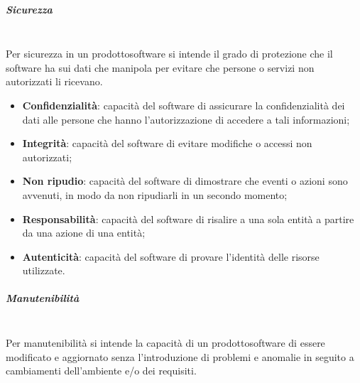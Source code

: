 		\subparagraph{Sicurezza} \mbox{}\\
		Per sicurezza in un prodotto\glosp software si intende il grado di protezione che il software ha sui dati che manipola per evitare che persone o servizi non autorizzati li ricevano.
		\begin{itemize}
			\item \textbf{Confidenzialità}: capacità del software di assicurare la confidenzialità dei dati alle persone che hanno l'autorizzazione di accedere a tali informazioni;
			\item \textbf{Integrità}: capacità del software di evitare modifiche o accessi non autorizzati;
			\item \textbf{Non ripudio}: capacità del software di dimostrare che eventi o azioni sono avvenuti, in modo da non ripudiarli in un secondo momento;
			\item \textbf{Responsabilità}: capacità del software di risalire a una sola entità a partire da una azione di una entità;
			\item \textbf{Autenticità}: capacità del software di provare l'identità delle risorse utilizzate.
		\end{itemize}
	
		\subparagraph{Manutenibilità} \mbox{}\\[1mm]
		Per manutenibilità si intende la capacità di un prodotto\glosp software di essere modificato e aggiornato senza l'introduzione di problemi e anomalie in seguito a cambiamenti dell'ambiente e/o dei requisiti.
